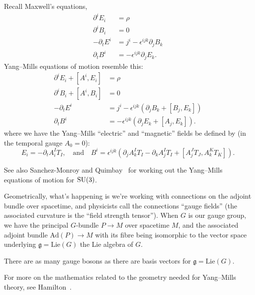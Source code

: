 Recall Maxwell's equations,
\begin{subequations}
\begin{align}
\partial^{i}E_{i} &= \rho\\
\partial^{i}B_{i} &= 0\\
-\partial_{t}E^{i} &= j^{i} -\epsilon^{ijk}\partial_{j}B_{k}\\
\partial_{t}B^{i} &= -\epsilon^{ijk}\partial_{j}E_{k}.
\end{align}
\end{subequations}
Yang--Mills equations of motion resemble this:
\begin{subequations}
\begin{align}
\partial^{i}E_{i} + [A^{i},E_{i}] &= \rho\\
\partial^{i}B_{i} + [A^{i},B_{i}] &= 0\\
-\partial_{t}E^{i} &= j^{i} -\epsilon^{ijk}(\partial_{j}B_{k} + [B_{j},E_{k}])\\
\partial_{t}B^{i} &= -\epsilon^{ijk}(\partial_{j}E_{k} + [A_{j},E_{k}]).
\end{align}
\end{subequations}
where we have the Yang--Mills ``electric'' and ``magnetic'' fields be
defined by (in the temporal gauge $A_{0}=0$):
\begin{equation}
E_{i} = -\partial_{t}A_{i}^{I}T_{I},\quad\mbox{and}\quad
B^{i} = \epsilon^{ijk}(\partial_{j}A_{k}^{I}T_{I} - \partial_{k}A_{j}^{I}T_{I}
+ [A_{j}^{J}T_{J}, A_{k}^{K}T_{K}]).
\end{equation}

\begin{remark}
See also Sanchez-Monroy and Quimbay~\cite{Sanchez-Monroy:2006sie} for
working out the Yang--Mills equations of motion for $\operatorname{SU}(3)$.
\end{remark}

\M
Geometrically, what's happening is we're working with connections on the
adjoint bundle over spacetime, and physicists call the connections
``gauge fields'' (the associated curvature is the ``field strength tensor'').
When $G$ is our gauge group, we have the principal $G$-bundle $P\to M$
over spacetime $M$, and the associated adjoint bundle $\mathrm{Ad}(P)\to M$
with its fibre being isomorphic to the vector space underlying
$\mathfrak{g}=\mathrm{Lie}(G)$ the Lie algebra of $G$.

There are as many gauge bosons as there are basis vectors for $\mathfrak{g}=\mathrm{Lie}(G)$.

For more on the mathematics related to the geometry needed for
Yang--Mills theory, see Hamilton~\cite{Hamilton:2017gbn}.

